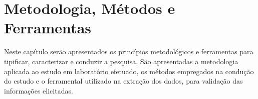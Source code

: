 \chapter{Metodologia, Métodos e Ferramentas} \label{sec:methodology}
Neste capítulo serão apresentados os princípios metodológicos e ferramentas para tipificar, caracterizar e conduzir a pesquisa. São apresentadas a metodologia aplicada ao estudo em laboratório efetuado, os métodos empregados na condução do estudo e o ferramental utilizado na extração dos dados, para validação das informações elicitadas.


% 
% 
